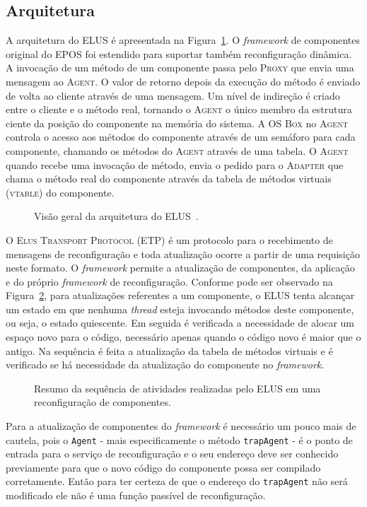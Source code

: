 \documentclass[12pt]{article}
\newcommand{\fig}[4][h]{
  \begin{figure}[#1] {\centering{\texttt{[image: fig/\#2]}}\par}
    \caption{#3\label{fig:#2}}
  \end{figure}
}
\newcommand{\proxy}{\textsc{Proxy}}
\newcommand{\agent}{\textsc{Agent}}
\newcommand{\adapter}{\textsc{Adapter}}
\newcommand{\vtable}{\textsc{vtable}}
\begin{document}
\subsection{Arquitetura}
A arquitetura do ELUS é apresentada na Figura~\ref{fig:architecture_v2.pdf}. O \textit{framework} de componentes original do EPOS foi estendido para suportar também reconfiguração dinâmica. A invocação de um método de um componente passa pelo \proxy{} que envia uma mensagem ao \agent{}. O valor de retorno depois da execução do método é enviado de volta ao cliente através de uma mensagem. Um nível de indireção é criado entre o cliente e o método real, tornando o \agent{} o único membro da estrutura ciente da posição do componente na memória do sistema. A \textsc{OS Box} no \agent{} controla o acesso aos métodos do componente através de um semáforo para cada componente, chamando os métodos do \agent{} através de uma tabela. O \agent{} quando recebe uma invocação de método, envia o pedido para o \adapter{} que chama o método real do componente através da tabela de métodos virtuais (\vtable{}) do componente.

\fig{architecture_v2.pdf}{Visão geral da arquitetura do ELUS~\cite{gracioli2010elus}.}{scale=.65}

O \textsc{Elus Transport Protocol} (ETP) é um protocolo para o recebimento de mensagens de reconfiguração e toda atualização ocorre a partir de uma requisição neste formato. O \textit{framework} permite a atualização de componentes, da aplicação e do próprio \textit{framework} de reconfiguração. Conforme pode ser observado na Figura~\ref{fig:update_componente_rita.pdf}, para atualizações referentes a um componente, o ELUS tenta alcançar um estado em que nenhuma \textit{thread} esteja invocando métodos deste componente, ou seja, o estado quiescente. Em seguida é verificada a necessidade de alocar um espaço novo para o código, necessário apenas quando o código novo é maior que o antigo. Na sequência é feita a atualização da tabela de métodos virtuais e é verificado se há necessidade da atualização do componente no \textit{framework}. 

\fig{update_componente_rita.pdf}{Resumo da sequ\^{e}ncia de atividades realizadas pelo ELUS em uma reconfiguração de componentes.\cite{gracioli2009elus}}{scale=.65}

Para a atualização de componentes do \textit{framework} é necessário um pouco mais de cautela, pois o \texttt{Agent} - mais especificamente o método \texttt{trapAgent} - é o ponto de entrada para o serviço de reconfiguração e o seu endereço deve ser conhecido previamente para que o novo código do componente possa ser compilado corretamente. Então para ter certeza de que o endereço do \texttt{trapAgent} não será modificado ele não é uma função passível de reconfiguração.
\end{document}
